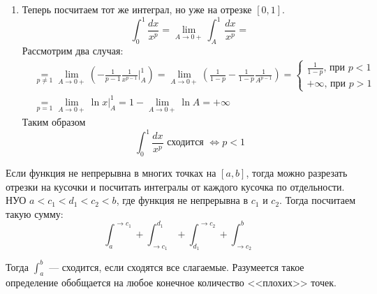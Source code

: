 \begin{examples}
\begin{enumerate}
      \item Теперь посчитаем тот же интеграл, но уже на отрезке $[0, 1]$.
      \begin{equation*}
          \int_{0}^{1} \frac{dx}{x^p} = \lim_{A \to 0+} \int_{A}^{1} \frac{dx}{x^p} =
      \end{equation*}
      Рассмотрим два случая:
      \begin{align*}
        &\underset{p \ne 1}{=} \lim\limits_{A \to 0+} \left(-\frac{1}{p - 1}\frac{1}{x^{p - 1}}\Big |_{A}^{1}\right) =
        \lim\limits_{A \to 0+}\left(\frac{1}{1 - p} - \frac{1}{1 - p}\frac{1}{A^{p - 1}}\right) =
        \begin{cases}
          \frac{1}{1 - p}\text{, при $p < 1$}\\
          +\infty\text{, при $p > 1$}
        \end{cases} \\
        &\underset{p = 1}{=} \lim\limits_{A \to 0+} \ln x \Big |_{A}^{1} =
        1 - \lim\limits_{A \to 0+} \ln A = +\infty
      \end{align*}
      Таким образом
      \begin{equation*}
          \int_{0}^{1} \frac{dx}{x^p}\text{ сходится } \iff p < 1
      \end{equation*}
    \end{enumerate}
  \end{examples}
  \begin{notice}
      Если функция не непрерывна в многих точках на $[a, b]$, тогда можно разрезать отрезки на кусочки и посчитать интегралы от каждого кусочка по отдельности. НУО $a < c_1 < d_1 < c_2 < b$, где функция не непрерывна в $c_1$ и $c_2$. Тогда посчитаем такую сумму:
      \begin{equation*}
          \int_{a}^{\to c_1} + \int_{\to c_1}^{d_1} + \int_{d_1}^{\to c_2} + \int_{\to c_2}^{b}
      \end{equation*}
  
      Тогда $\int_{a}^{b}$ --- сходится, если сходятся все слагаемые. Разумеется такое определение обобщается на любое конечное количество <<плохих>> точек.
  \end{notice}
  